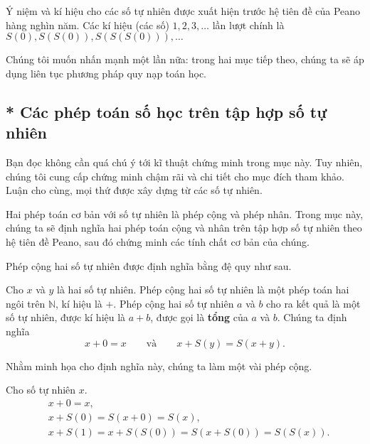 Ý niệm và kí hiệu cho các số tự nhiên được xuất hiện trước hệ tiên đề của Peano hàng nghìn năm. Các kí hiệu (các số) $1, 2, 3,\ldots$ lần lượt chính là $S(0), S(S(0)), S(S(S(0))),\ldots$

Chúng tôi muốn nhấn mạnh một lần nữa: trong hai mục tiếp theo, chúng ta sẽ áp dụng liên tục phương pháp quy nạp toán học.

\subsection{* Các phép toán số học trên tập hợp số tự nhiên}

Bạn đọc không cần quá chú ý tới kĩ thuật chứng minh trong mục này. Tuy nhiên, chúng tôi cung cấp chứng minh chậm rãi và chi tiết cho mục đích tham khảo. Luận cho cùng, mọi thứ được xây dựng từ các số tự nhiên.

Hai phép toán cơ bản với số tự nhiên là phép cộng và phép nhân. Trong mục này, chúng ta sẽ định nghĩa hai phép toán cộng và nhân trên tập hợp số tự nhiên theo hệ tiên đề Peano, sau đó chứng minh các tính chất cơ bản của chúng.

Phép cộng hai số tự nhiên được định nghĩa bằng đệ quy như sau.

\begin{definition}
    Cho $x$ và $y$ là hai số tự nhiên. Phép cộng hai số tự nhiên là một phép toán hai ngôi trên $\mathbb{N}$, kí hiệu là $+$. Phép cộng hai số tự nhiên $a$ và $b$ cho ra kết quả là một số tự nhiên, được kí hiệu là $a + b$, được gọi là \textbf{tổng} của $a$ và $b$. Chúng ta định nghĩa
    \[
        x + 0 = x\qquad\text{và}\qquad x + S(y) = S(x + y).
    \]
\end{definition}

Nhằm minh họa cho định nghĩa này, chúng ta làm một vài phép cộng.
\begin{example}
    Cho số tự nhiên $x$.
    \begin{align*}
         & x + 0 = x,                                      \\
         & x + S(0) = S(x + 0) = S(x),                     \\
         & x + S(1) = x + S(S(0)) = S(x + S(0)) = S(S(x)).
    \end{align*}
\end{example}


